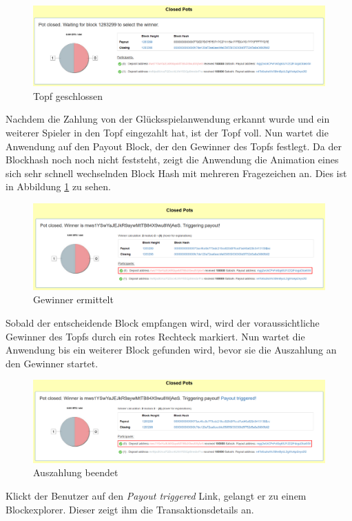 \begin{figure}[H]
\centering
\includegraphics[width=1\linewidth]{Figures/btc_gui/pot_closed}
\decoRule
\caption{Topf geschlossen}
\label{fig:pot_closed}
\end{figure}
Nachdem die Zahlung von der Glücksspielanwendung erkannt wurde und ein weiterer Spieler in den Topf eingezahlt hat, ist der Topf voll. Nun wartet die Anwendung auf den Payout Block, der den Gewinner des Topfs festlegt. Da der Blockhash noch noch nicht feststeht, zeigt die Anwendung die Animation eines sich sehr schnell wechselnden Block Hash mit mehreren Fragezeichen an. Dies ist in Abbildung \ref{fig:pot_closed} zu sehen.

\begin{figure}[H]
\centering
\includegraphics[width=1\linewidth]{Figures/btc_gui/pot_settled}
\decoRule
\caption{Gewinner ermittelt}
\label{fig:pot_settled}
\end{figure}
Sobald der entscheidende Block empfangen wird, wird der voraussichtliche Gewinner des Topfs durch ein rotes Rechteck markiert. Nun wartet die Anwendung bis ein weiterer Block gefunden wird, bevor sie die Auszahlung an den Gewinner startet. 

\begin{figure}[H]
\centering
\includegraphics[width=1\linewidth]{Figures/btc_gui/pot_payout_finished}
\decoRule
\caption{Auszahlung beendet}
\label{fig:pot_settled}
\end{figure}

Klickt der Benutzer auf den \emph{Payout triggered} Link, gelangt er zu einem Blockexplorer. Dieser zeigt ihm die Transaktionsdetails an.